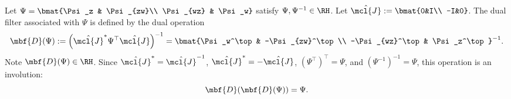 \begin{definition}
	Let	$\Psi=\bmat{\Psi_z & \Psi_{zw}\\ \Psi_{wz} & \Psi_w}$ satisfy
	$\Psi,\Psi^{-1}\in\RH$. Let $\hat{\mcl{J}}:=\bmat{0&I\\ -I&0}$.
	The dual filter associated with $\Psi$ is defined by the
	dual operation
	\begin{equation}\label{eqn:dualoperation}
		\mbf{D}(\Psi)
		:=
		\left(\hat{\mcl{J}}^*\Psi^\top\hat{\mcl{J}}\right)^{-1}
		=
		\bmat{\Psi_w^\top & -\Psi_{zw}^\top\\
		      -\Psi_{wz}^\top & \Psi_z^\top}^{-1}.
	\end{equation}
	Note $\mbf{D}(\Psi)\in\RH$. Since $\hat{\mcl{J}}^*=\hat{\mcl{J}}^{-1}$,
	$\hat{\mcl{J}}^*=-\hat{\mcl{J}}$, $(\Psi^\top)^\top=\Psi$, and
	$(\Psi^{-1})^{-1}=\Psi$, this operation is an involution:
	\begin{equation}\label{eqn:dualoperationinvolution}
		\mbf{D}(\mbf{D}(\Psi))=\Psi.
	\end{equation}


\end{definition}
